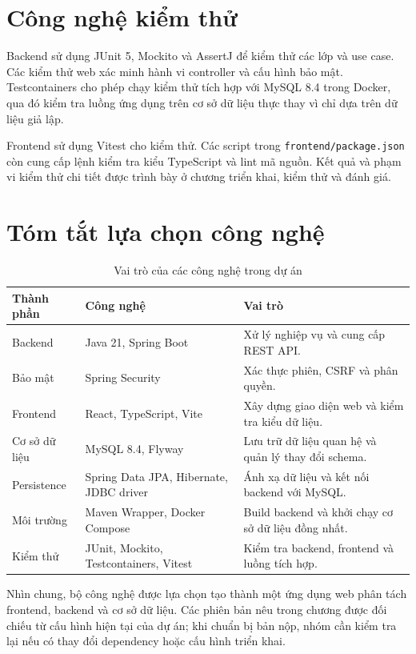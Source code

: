 \section{Công nghệ kiểm thử}

Backend sử dụng JUnit 5, Mockito và AssertJ để kiểm thử các lớp và use case. Các kiểm thử web xác minh hành vi controller và cấu hình bảo mật. Testcontainers cho phép chạy kiểm thử tích hợp với MySQL 8.4 trong Docker, qua đó kiểm tra luồng ứng dụng trên cơ sở dữ liệu thực thay vì chỉ dựa trên dữ liệu giả lập.

Frontend sử dụng Vitest cho kiểm thử. Các script trong \texttt{frontend/package.json} còn cung cấp lệnh kiểm tra kiểu TypeScript và lint mã nguồn. Kết quả và phạm vi kiểm thử chi tiết được trình bày ở chương triển khai, kiểm thử và đánh giá.

\section{Tóm tắt lựa chọn công nghệ}

\begin{table}[htbp]
\centering
\caption{Vai trò của các công nghệ trong dự án}
\label{tab:technology-summary}
\begin{tabular}{|p{3.2cm}|p{4cm}|p{5.8cm}|}
\hline
\textbf{Thành phần} & \textbf{Công nghệ} & \textbf{Vai trò} \\ \hline
Backend & Java 21, Spring Boot & Xử lý nghiệp vụ và cung cấp REST API. \\ \hline
Bảo mật & Spring Security & Xác thực phiên, CSRF và phân quyền. \\ \hline
Frontend & React, TypeScript, Vite & Xây dựng giao diện web và kiểm tra kiểu dữ liệu. \\ \hline
Cơ sở dữ liệu & MySQL 8.4, Flyway & Lưu trữ dữ liệu quan hệ và quản lý thay đổi schema. \\ \hline
Persistence & Spring Data JPA, Hibernate, JDBC driver & Ánh xạ dữ liệu và kết nối backend với MySQL. \\ \hline
Môi trường & Maven Wrapper, Docker Compose & Build backend và khởi chạy cơ sở dữ liệu đồng nhất. \\ \hline
Kiểm thử & JUnit, Mockito, Testcontainers, Vitest & Kiểm tra backend, frontend và luồng tích hợp. \\ \hline
\end{tabular}
\end{table}

Nhìn chung, bộ công nghệ được lựa chọn tạo thành một ứng dụng web phân tách frontend, backend và cơ sở dữ liệu. Các phiên bản nêu trong chương được đối chiếu từ cấu hình hiện tại của dự án; khi chuẩn bị bản nộp, nhóm cần kiểm tra lại nếu có thay đổi dependency hoặc cấu hình triển khai.
